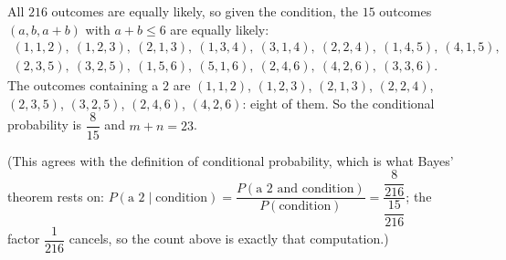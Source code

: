 All $216$ outcomes are equally likely, so given the condition, the $15$ outcomes $(a,b,a+b)$ with $a+b\le6$ are equally likely:
\[
\begin{array}{l}
(1,1,2),\ (1,2,3),\ (2,1,3),\ (1,3,4),\ (3,1,4),\ (2,2,4),\ (1,4,5),\ (4,1,5),\\
(2,3,5),\ (3,2,5),\ (1,5,6),\ (5,1,6),\ (2,4,6),\ (4,2,6),\ (3,3,6).
\end{array}
\]
The outcomes containing a $2$ are $(1,1,2)$, $(1,2,3)$, $(2,1,3)$, $(2,2,4)$, $(2,3,5)$, $(3,2,5)$, $(2,4,6)$, $(4,2,6)$: eight of them. So the conditional probability is $\dfrac{8}{15}$ and $m+n=\boxed{23}$.

(This agrees with the definition of conditional probability, which is what Bayes' theorem rests on: $P(\text{a }2\mid\text{condition})=\dfrac{P(\text{a }2\text{ and condition})}{P(\text{condition})}=\dfrac{\dfrac{8}{216}}{\dfrac{15}{216}}$; the factor $\dfrac{1}{216}$ cancels, so the count above is exactly that computation.)
